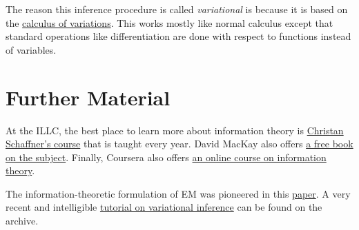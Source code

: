 The reason this inference procedure is called \textit{variational} is because it is based on the 
\href{https://en.wikipedia.org/wiki/Calculus_of_variations}{calculus of variations}. This works mostly
like normal calculus except that standard operations like differentiation are done with respect to functions
instead of variables.




\section*{Further Material}

At the ILLC, the best place to learn more about information theory is \href{http://homepages.cwi.nl/~schaffne/courses/inftheory/2015/}{Christan Schaffner's
course} that is taught every year. David MacKay also offers \href{http://www.inference.phy.cam.ac.uk/itprnn/book.pdf}{a free book on the subject}. Finally,
Coursera also offers \href{https://www.coursera.org/course/informationtheory}{an online course on information theory}.

The information-theoretic formulation of EM was pioneered in this \href{http://www.cs.toronto.edu/~fritz/absps/emk.pdf}{paper}. A very recent and intelligible 
\href{https://arxiv.org/abs/1601.00670}{tutorial on variational inference} can be found on the archive.


